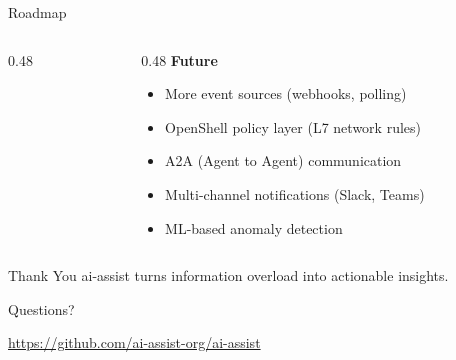 \documentclass[aspectratio=169,10pt]{beamer}
\begin{document}
\begin{frame}{Roadmap}
\begin{columns}[T]
\begin{column}{0.48\textwidth}
\begin{itemize}
\end{itemize}
\end{column}
\begin{column}{0.48\textwidth}
\textbf{Future}
\begin{itemize}\scriptsize\setlength{\itemsep}{1pt}
  \item More event sources (webhooks, polling)
  \item OpenShell policy layer (L7 network rules)
  \item A2A (Agent to Agent) communication
  \item Multi-channel notifications (Slack, Teams)
  \item ML-based anomaly detection
\end{itemize}
\end{column}
\end{columns}
\end{frame}

\begin{frame}{Thank You}
\vfill
\centering
\large\color{rhred}
ai-assist turns information overload into actionable insights.

\medskip
\normalsize\color{rhdarkgray} Questions?

\smallskip
\small\url{https://github.com/ai-assist-org/ai-assist}
\end{frame}
\end{document}
